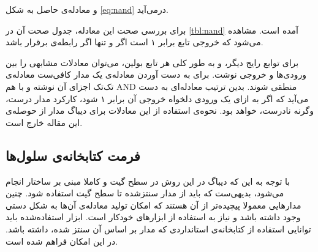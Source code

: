 \documentclass{article}
\begin{document}
و معادله‌ی حاصل به شکل \ref{eq:nand} درمی‌آید.

\begin{flushleft}\end{flushleft}

برای بررسی صحت این معادله، جدول صحت آن در  \ref{tbl:nand} آمده است. مشاهده می‌شود که خروجی تابع  برابر ۱ است اگر و تنها اگر رابطه‌ی  برقرار باشد. 


برای توابع رایج دیگر، و به طور کلی هر تابع بولین، می‌توان معادلات مشابهی را بین ورودی‌ها و خروجی نوشت. برای به دست آوردن معادله‌ی یک مدار کافی‌ست معادله‌ی تک‌تک اجزای آن نوشته و با هم AND منطقی شوند. بدین ترتیب معادله‌ای به دست می‌آید که اگر به ازای یک ورودی دلخواه خروجی آن برابر ۱ شود، کارکرد مدار درست، وگرنه نادرست، خواهد بود. نحوه‌ی استفاده از این معادلات برای دیباگ مدار از حوصله‌ی این مقاله خارج است.  

\subsection{فرمت کتابخانه‌ی سلول‌ها}
با توجه به این که دیباگ در این روش در سطح گیت و کاملا مبنی بر ساختار انجام می‌شود، بدیهی‌ست که باید از مدار سنتزشده تا سطح گیت استفاده شود. چنین مدارهایی معمولا پیچیده‌تر از آن هستند که امکان تولید معادله‌ی آن‌ها به شکل دستی وجود داشته باشد و نیاز به استفاده از ابزارهای خودکار است. ابزار استفاده‌شده باید توانایی استفاده از کتابخانه‌ی استانداردی که مدار بر اساس آن سنتز شده، داشته باشد. در  این امکان فراهم شده است. 
\end{document}
